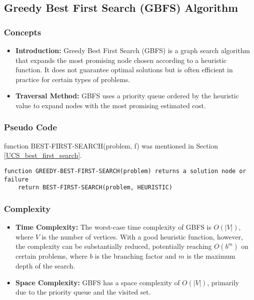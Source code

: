 \subsection{Greedy Best First Search (GBFS) Algorithm }
\subsubsection*{Concepts}
\begin{itemize}
    \item \textbf{Introduction:} Greedy Best First Search (GBFS) is a graph search algorithm that expands the most promising node chosen according to a heuristic function. It does not guarantee optimal solutions but is often efficient in practice for certain types of problems.
    \item \textbf{Traversal Method:} GBFS uses a priority queue ordered by the heuristic value to expand nodes with the most promising estimated cost.
\end{itemize}

\subsubsection*{Pseudo Code}
function BEST-FIRST-SEARCH(problem, f) was mentioned in Section \ref{UCS_best_first_search}.
\begin{verbatim}
function GREEDY-BEST-FIRST-SEARCH(problem) returns a solution node or failure
    return BEST-FIRST-SEARCH(problem, HEURISTIC)

\end{verbatim}

\subsubsection*{Complexity}
\begin{itemize}
    \item \textbf{Time Complexity:} The worst-case time complexity of GBFS is \( O(|V|) \), where \( V \) is the number of vertices. With a good heuristic function, however, the complexity can be substantially reduced, potentially reaching \( O(b^m) \) on certain problems, where \( b \) is the branching factor and \( m \) is the maximum depth of the search.
    \item \textbf{Space Complexity:} GBFS has a space complexity of \( O(|V|) \), primarily due to the priority queue and the visited set.
\end{itemize}

